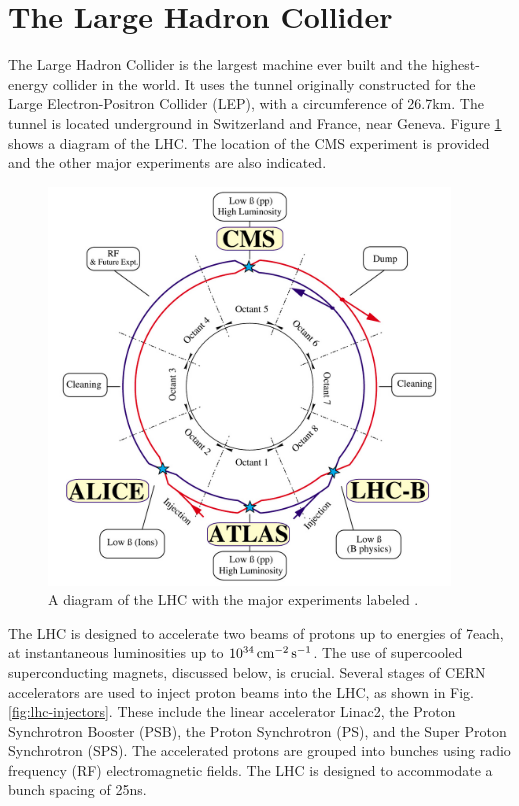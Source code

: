 \section{The Large Hadron Collider}

The Large Hadron Collider is the largest machine ever built and the highest-energy collider in the world. It uses the tunnel originally constructed for the Large Electron-Positron Collider (LEP), with a circumference of 26.7\unit{km}. The tunnel is located underground in Switzerland and France, near Geneva. Figure \ref{fig:lhc-diagram} shows a diagram of the LHC. The location of the CMS experiment is provided and the other major experiments are also indicated.

\begin{figure}[hbt]
\begin{center}
\includegraphics[width=0.95\textwidth]{figures/lhc-pho-1997-060.png}
\caption{A diagram of the LHC with the major experiments labeled \cite{Jean-Luc:841573}.}
\label{fig:lhc-diagram}
\end{center}
\end{figure}

The LHC is designed to accelerate two beams of protons up to energies of 7\TeV each, at instantaneous luminosities up to $10^{34}\,\text{cm}^\text{$-$2}\,\text{s}^\text{$-$1}$. The use of supercooled superconducting magnets, discussed below, is crucial. Several stages of CERN accelerators are used to inject proton beams into the LHC, as shown in Fig. \ref{fig:lhc-injectors}. These include the linear accelerator Linac2, the Proton Synchrotron Booster (PSB), the Proton Synchrotron (PS), and the Super Proton Synchrotron (SPS). The accelerated protons are grouped into bunches using radio frequency (RF) electromagnetic fields. The LHC is designed to accommodate a bunch spacing of 25\unit{ns}.

